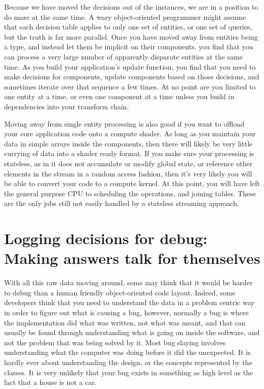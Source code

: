 Because we have moved the decisions out of the instances, we are in a position
to do more at the same time. A wary object-oriented programmer might assume
that each decision table applies to only one set of entities, or one set of
queries, but the truth is far more parallel. Once you have moved away from
entities being a type, and instead let them be implicit on their components,
you find that you can process a very large number of apparently disparate
entities at the same time. As you build your application's update function, you
find that you need to make decisions for components, update components based on
those decisions, and sometimes iterate over that sequence a few times. At no
point are you limited to one entity at a time, or even one component at a time
unless you build in dependencies into your transform chain.

Moving away from single entity processing is also good if you want to offload
your core application code onto a compute shader. As long as you maintain your
data in simple arrays inside the components, then there will likely be very
little currying of data into a shader ready format. If you make sure your
processing is stateless, as in it does not accumulate or modify global state,
or reference other elements in the stream in a random access fashion, then it's
very likely you will be able to convert your code to a compute kernel. At this
point, you will have left the general purpose CPU to scheduling the operations,
and joining tables. These are the only jobs still not easily handled by a
stateless streaming approach.

\section[Logging decisions for debug]{Logging decisions for debug: Making answers talk for
themselves}

With all this raw data moving around, some may think that it would be harder to
debug than a human friendly object-oriented code layout. Indeed, some
developers think that you need to understand the data in a problem centric way
in order to figure out what is causing a bug, however, normally a bug is where
the implementation did what was written, not what was meant, and that can
usually be found through understanding what is going on inside the software,
and not the problem that was being solved by it. Most bug slaying involves
understanding what the computer was doing before it did the unexpected. It is
hardly ever about understanding the design, or the concepts represented by the
classes. It is very unlikely that your bug exists in something as high level as
the fact that a house is not a car.

